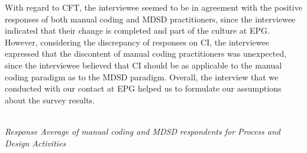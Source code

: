 \documentclass[final_report_innit.tex]{subfiles}
\begin{document}
With regard to CFT, the interviewee seemed to be in agreement with the positive responses of both manual coding and MDSD practitioners, since the interviewee indicated that their change is completed and part of the culture at EPG. However, considering the discrepancy of responses on CI, the interviewee expressed that the discontent of manual coding practitioners was unexpected, since the interviewee believed that CI should be as applicable to the manual coding paradigm as to the MDSD paradigm. Overall, the interview that we conducted with our contact at EPG helped us to formulate our assumptions about the survey results. 
\\
\\


\begin{center}\textit{Response Average of manual coding and MDSD respondents for Process and Design Activities}\end{center}
\end{document}
